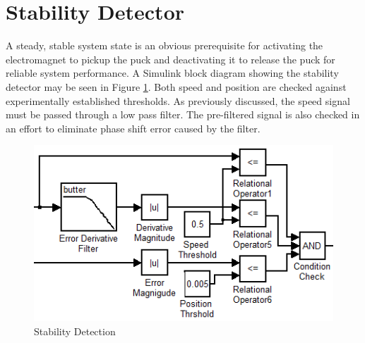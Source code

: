 \section{Stability Detector}
\label{sec:StabilityDetector}

A steady, stable system state is an obvious prerequisite for activating the electromagnet to pickup the puck and deactivating it to release the puck for reliable system performance.
A Simulink block diagram showing the stability detector may be seen in Figure \ref{fig:simulinkstability}.
Both speed and position are checked against experimentally established thresholds.
As previously discussed, the speed signal must be passed through a low pass filter. 
The pre-filtered signal is also checked in an effort to eliminate phase shift error caused by the filter.

\begin{figure}[htp]
    \centering
    \includegraphics[scale=0.75]{images/StabilityDetector.PNG}
    \caption{Stability Detection}
    \label{fig:simulinkstability}
\end{figure}
